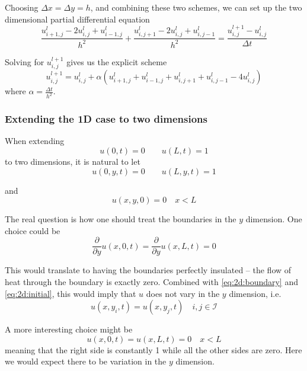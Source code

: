 \documentclass[10pt,a4paper]{article}
\newcommand{\indexset}{\mathcal{I}}
\newcommand{\dt}{{\Delta t}}
\newcommand{\dx}{{\Delta x}}
\newcommand{\dy}{{\Delta y}}
\newcommand{\fracpy}{\frac{\partial}{\partial y}}
\begin{document}
Choosing $\dx = \dy = h$, and combining these two schemes, we can set up the two dimensional partial differential equation
\begin{equation}
\frac{u_{i+1,j}^l - 2u_{i,j}^l + u_{i-1,j}^l}{h^2} + \frac{u_{i,j+1}^l - 2u_{i,j}^l + u_{i,j-1}^l}{h^2} = \frac{u_{i,j}^{l+1} - u_{i,j}^l}{\dt}
\end{equation}

Solving for $u_{i,j}^{l+1}$ gives us the explicit scheme
\begin{equation}
u_{i,j}^{l+1} = u_{i,j}^l + \alpha\left( u_{i+1,j}^l + u_{i-1,j}^l + u_{i,j+1}^l + u_{i,j-1}^l - 4u_{i,j}^l \right)
\end{equation}
where $\alpha = \frac{\dt}{h^2}$.

\subsubsection{Extending the 1D case to two dimensions}
When extending
\begin{equation}
u(0,t) = 0 \quad \quad u(L,t) = 1
\end{equation}
to two dimensions, it is natural to let
\begin{equation}
\label{eq:2d:boundary}
u(0,y,t) = 0 \quad \quad u(L,y,t) = 1
\end{equation}

and
\begin{equation}
\label{eq:2d:initial}
u(x,y,0) = 0 \quad x < L
\end{equation}


The real question is how one should treat the boundaries in the $y$ dimension.
One choice could be
\begin{equation}
\fracpy u(x,0,t) = \fracpy u(x,L,t) = 0
\end{equation}

This would translate to having the boundaries perfectly insulated -- the flow of heat through the boundary is exactly zero. Combined with \ref{eq:2d:boundary} and \ref{eq:2d:initial}, this would imply that $u$ does not vary in the $y$ dimension, i.e.
\begin{equation}
u(x,y_i,t) = u(x,y_j,t) \quad i, j \in \indexset
\end{equation}

A more interesting choice might be
\begin{equation}
u(x,0,t)=u(x,L,t)=0 \quad x < L
\end{equation}
meaning that the right side is constantly 1 while all the other sides are zero. Here we would expect there to be variation in the $y$ dimension.
\end{document}
